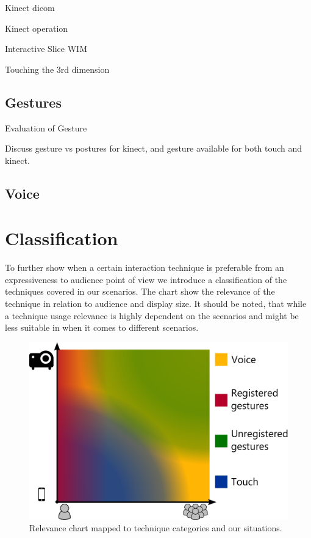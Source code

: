 \documentclass[review,journal]{vgtc}         %
\begin{document}
Kinect dicom \cite{zora82163}

Kinect operation \cite{OHaraGSPVMCCRDC14}

Interactive Slice WIM \cite{Coffey:2012:ISW:2360744.2360843}


Touching the 3rd dimension \cite{DBLP:journals/dagstuhl-reports/KeefeKSR12}

\subsection{Gestures}

Evaluation of Gesture \cite{Kirmizibayrak:2011:EGB:2087756.2087764}

Discuss gesture vs postures \cite{isenberg:hal-00781237} for kinect, and gesture available for both touch and kinect.

\subsection{Voice}

\section{Classification}

To further show when a certain interaction technique is preferable from an expressiveness to audience point of view we introduce a classification of the techniques covered in our scenarios. The chart show the relevance of the technique in relation to audience and display size. It should be noted, that while a technique usage relevance is highly dependent on the scenarios and might be less suitable in when it comes to different scenarios.

\begin{figure}[htb]
	\centering
	\includegraphics[width=1.0\linewidth]{classification.pdf}
	\caption{Relevance chart mapped to technique categories and our situations.}
	\label{classifiy_diagram}
\end{figure}
\end{document}
